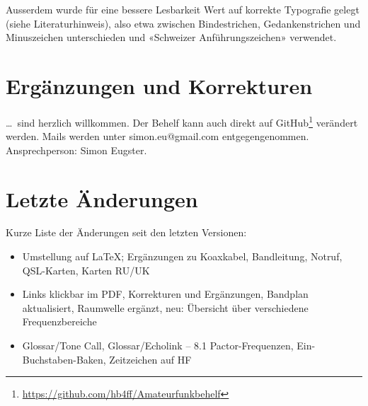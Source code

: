Ausserdem wurde für eine bessere Lesbarkeit Wert auf korrekte Typografie gelegt (siehe Literaturhinweis), also etwa zwischen Bindestrichen, Gedankenstrichen und Minuszeichen unterschieden und «Schweizer Anführungszeichen» verwendet. 

\section{Ergänzungen und Korrekturen}
\dots~sind herzlich willkommen. Der Behelf kann auch direkt auf GitHub\footnote{\href{https://github.com/hb4ff/Amateurfunkbehelf}{https://github.com/hb4ff/Amateurfunkbehelf}} verändert werden. Mails werden unter simon.eu@gmail.com entgegengenommen. Ansprechperson: Simon Eugster. 

\section{Letzte Änderungen}
Kurze Liste der Änderungen seit den letzten Versionen:
\begin{itemize}
 \item[Feb 13] Umstellung auf LaTeX; Ergänzungen zu Koaxkabel, Bandleitung, Notruf, QSL-Karten, Karten RU/UK
 \item[v8.1]   Links klickbar im PDF, Korrekturen und Ergänzungen, Bandplan aktualisiert, Raumwelle ergänzt, neu: Übersicht über verschiedene Frequenzbereiche
 \item[v8]     Glossar/Tone Call, Glossar/Echolink – 8.1 Pactor-Frequenzen, Ein-Buchstaben-Baken, Zeitzeichen auf HF
\end{itemize}




